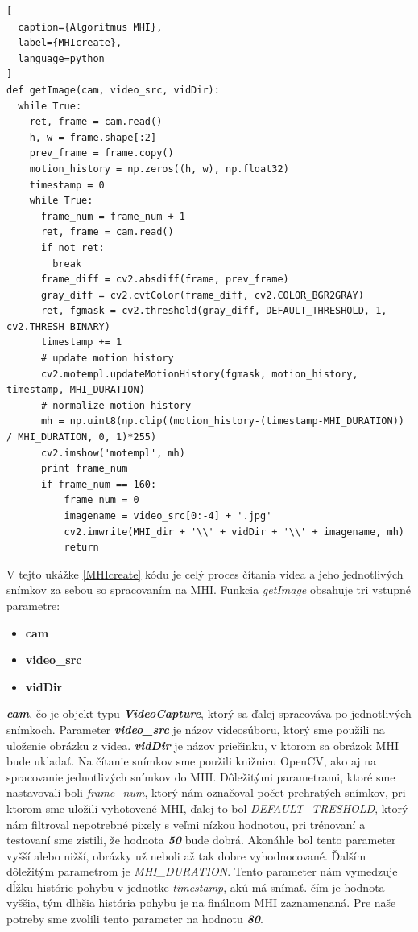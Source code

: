 \begin{lstlisting}[
  caption={Algoritmus MHI},
  label={MHIcreate},
  language=python
]
def getImage(cam, video_src, vidDir):
  while True:    
    ret, frame = cam.read()
    h, w = frame.shape[:2]
    prev_frame = frame.copy()
    motion_history = np.zeros((h, w), np.float32)
    timestamp = 0
    while True:
      frame_num = frame_num + 1
      ret, frame = cam.read()
      if not ret:
        break
      frame_diff = cv2.absdiff(frame, prev_frame)
      gray_diff = cv2.cvtColor(frame_diff, cv2.COLOR_BGR2GRAY)
      ret, fgmask = cv2.threshold(gray_diff, DEFAULT_THRESHOLD, 1, cv2.THRESH_BINARY)
      timestamp += 1
      # update motion history
      cv2.motempl.updateMotionHistory(fgmask, motion_history, timestamp, MHI_DURATION)
      # normalize motion history
      mh = np.uint8(np.clip((motion_history-(timestamp-MHI_DURATION)) / MHI_DURATION, 0, 1)*255)
      cv2.imshow('motempl', mh)
      print frame_num
      if frame_num == 160:
          frame_num = 0
          imagename = video_src[0:-4] + '.jpg'
          cv2.imwrite(MHI_dir + '\\' + vidDir + '\\' + imagename, mh)
          return
\end{lstlisting}


V tejto ukážke \ref{MHIcreate} kódu je celý proces čítania videa a jeho jednotlivých snímkov za sebou so spracovaním na MHI. Funkcia \textit{getImage} obsahuje tri vstupné parametre:
\begin{itemize}
\item \textbf{cam}
\item \textbf{video\_src}
\item \textbf{vidDir}
\end{itemize}

 \textbf{\textit{cam}}, čo je objekt typu \textbf{\textit{VideoCapture}}, ktorý sa ďalej spracováva po jednotlivých snímkoch. 
 Parameter \textbf{\textit{video\_src}} je názov videosúboru, ktorý sme použili na uloženie obrázku z videa.
 \textbf{\textit{vidDir}} je názov priečinku, v ktorom sa obrázok MHI bude ukladať. 
 Na čítanie snímkov sme použili knižnicu OpenCV, ako aj na spracovanie jednotlivých snímkov do MHI. Dôležitými parametrami, ktoré sme nastavovali boli \textit{frame\_num}, ktorý nám označoval počet prehratých snímkov, pri ktorom sme uložili vyhotovené MHI, ďalej to bol \textit{DEFAULT\_TRESHOLD}, ktorý nám filtroval nepotrebné pixely s veľmi nízkou hodnotou, pri trénovaní a testovaní sme zistili, že hodnota \textit{\textbf{50}} bude dobrá. Akonáhle bol tento parameter vyšší alebo nižší, obrázky už neboli až tak dobre vyhodnocované. Ďalším dôležitým parametrom je \textit{MHI\_DURATION}. Tento parameter nám vymedzuje dĺžku histórie pohybu v jednotke \textit{timestamp}, akú má snímať. čím je hodnota vyššia, tým dlhšia história pohybu je na finálnom MHI zaznamenaná. 
 Pre naše potreby sme zvolili tento parameter na hodnotu \textit{\textbf{80}}.

